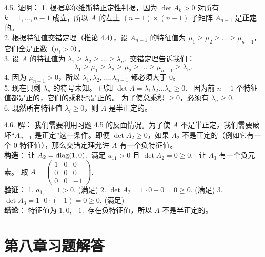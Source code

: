 \begin{exer}
4.5. 证明：
1. 根据塞尔维斯特正定性判据，因为 $\det A_k > 0$ 对所有 $k=1, \dots, n-1$ 成立，所以 $A$ 的左上 $(n-1) \times (n-1)$ 子矩阵 $A_{n-1}$ 是\textbf{正定}的。\\
2. 根据特征值交错定理（推论 4.4），设 $A_{n-1}$ 的特征值为 $\mu_1 \ge \mu_2 \ge \dots \ge \mu_{n-1}$，它们全是正数（$\mu_i > 0$）。\\
3. 设 $A$ 的特征值为 $\lambda_1 \ge \lambda_2 \ge \dots \ge \lambda_n$.~交错定理告诉我们：
   $$ \lambda_1 \ge \mu_1 \ge \lambda_2 \ge \mu_2 \ge \dots \ge \mu_{n-1} \ge \lambda_n. $$
4. 因为 $\mu_{n-1} > 0$，所以 $\lambda_1, \lambda_2, \dots, \lambda_{n-1}$ 都必须大于 0。\\
5. 现在只剩 $\lambda_n$ 的符号未知。
   已知 $\det A = \lambda_1 \lambda_2 \dots \lambda_n \ge 0$.~
   因为前 $n-1$ 个特征值都是正的，它们的乘积也是正的。
   为了使总乘积 $\ge 0$，必须有 $\lambda_n \ge 0$.~\\
6. 既然所有特征值 $\lambda_i \ge 0$，则 $A$ 是半正定的。

4.6. 解：
我们需要利用习题 4.5 的反面情况。为了使 $A$ 不是半正定，我们需要破坏“$A_{n-1}$ 是正定”这一条件。即便 $\det A_2 \ge 0$，如果 $A_2$ 不是正定的（例如它有一个 0 特征值），那么交错定理允许 $A$ 有一个负特征值。\\
\textbf{构造}：
让 $A_2 = \operatorname{diag}(1, 0)$.~满足 $a_{11} > 0$ 且 $\det A_2 = 0 \ge 0$.~
让 $A_3$ 有一个负元素。
取 $A = \begin{pmatrix} 1 & 0 & 0 \\ 0 & 0 & 0 \\ 0 & 0 & -1 \end{pmatrix}$.\\
\textbf{验证}：
1. $a_{1,1} = 1 > 0$. (满足)
2. $\det A_2 = 1 \cdot 0 - 0 = 0 \ge 0$. (满足)
3. $\det A_3 = 1 \cdot 0 \cdot (-1) = 0 \ge 0$. (满足)\\
\textbf{结论}：
特征值为 $1, 0, -1$.~存在负特征值，所以 $A$ 不是半正定的。


\vspace{5ex}

\end{exer}








\section*{第八章习题解答}

